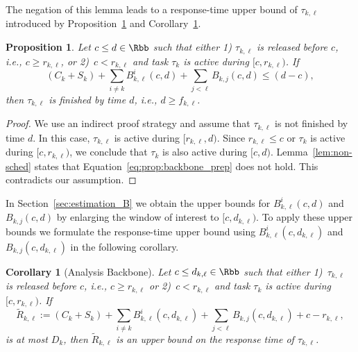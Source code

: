 \documentclass[conference]{IEEEtran}
\newtheorem{prop}[thm]{Proposition}
\newtheorem{cor}[thm]{Corollary}
\theoremstyle{definition}
\theoremstyle{remark}
\newcommand{\Rtilde}{\widetilde{R}}
\begin{document}
	The negation of this lemma leads to a response-time upper bound of $\tau_{k,\ell}$ introduced by Proposition~\ref{prop:backbone_prep} and Corollary~\ref{cor:backbone}.
	
	\begin{prop}\label{prop:backbone_prep}
      Let $c\leq d \in \Rbb$ such that either 1) $\tau_{k,\ell}$ is
      released before $c$, i.e., $c \geq r_{k,\ell}$, or 2)~$c < r_{k,\ell}$ and task $\tau_k$ is active during
        $[c,r_{k,\ell})$. If
		\begin{equation}\label{eq:prop:backbone_prep}
			(C_k+ S_k) + \sum_{i \neq k} B^i_{k,\ell}(c,d) + \sum_{j < \ell} B_{k,j}(c,d) \leq (d-c),
		\end{equation}
		then $\tau_{k,\ell}$ is finished by time $d$, i.e., $d \geq f_{k,\ell}$.
	\end{prop}
	
	\begin{proof}
		We use an indirect proof strategy and assume that $\tau_{k,\ell}$ is not finished by time $d$.
		In this case, $\tau_{k,\ell}$ is active during $[r_{k,\ell},d)$.
		Since $r_{k,\ell}\leq c$ or $\tau_k$ is active during $[c,r_{k,\ell})$, we conclude that $\tau_k$ is also active during $[c,d)$.
		Lemma~\ref{lem:non-sched} states that Equation~\eqref{eq:prop:backbone_prep} does not hold.
		This contradicts our assumption.
	\end{proof}
	
	In Section~\ref{sec:estimation_B} we obtain the upper bounds for $B^i_{k,\ell}(c,d)$ and $B_{k,j}(c,d)$ by enlarging the window of interest to $[c, d_{k,\ell})$.
	To apply these upper bounds we formulate the response-time upper bound using $B^i_{k,\ell}(c, d_{k,\ell})$ and $B_{k,j}(c, d_{k,\ell})$ in the following corollary.

	\begin{cor}[Analysis Backbone]\label{cor:backbone}
    Let $c\leq d_{k,\ell} \in \Rbb$ such that either 1)~$\tau_{k,\ell}$ is
    released before $c$, i.e., $c \geq r_{k,\ell}$ or 2)~$c < r_{k,\ell}$ and task $\tau_k$ is active during
        $[c,r_{k,\ell})$.
		If 
		\begin{equation}\label{eq:cor_sched_test}
			\Rtilde_{k,\ell} \!:=\!
			(C_k+ S_k) + \!\sum_{i \neq k}\! B^i_{k,\ell}(c,d_{k,\ell}) + \!\sum_{j < \ell}\! B_{k,j}(c,d_{k,\ell}) + c - r_{k,\ell},
		\end{equation}
		is at most $D_k$, then $\Rtilde_{k,\ell}$ is an upper bound on the response time of $\tau_{k,\ell}$.
	\end{cor}
	
\end{document}
